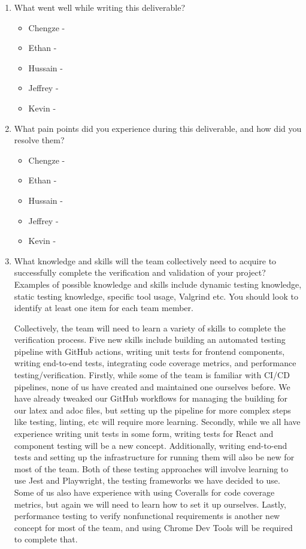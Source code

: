 \documentclass[12pt, titlepage]{article}
\begin{document}
\begin{enumerate}
  \item What went well while writing this deliverable?
  \begin{itemize}
    \item Chengze -
    \item Ethan -
    \item Hussain -
    \item Jeffrey -
    \item Kevin -
  \end{itemize}
  \item What pain points did you experience during this deliverable, and how
    did you resolve them?
  \begin{itemize}
    \item Chengze -
    \item Ethan -
    \item Hussain -
    \item Jeffrey -
    \item Kevin -
  \end{itemize}
  \item What knowledge and skills will the team collectively need to acquire to
  successfully complete the verification and validation of your project?
  Examples of possible knowledge and skills include dynamic testing knowledge,
  static testing knowledge, specific tool usage, Valgrind etc.  You should look to
  identify at least one item for each team member.

    Collectively, the team will need to learn a variety of skills to complete
    the verification process. Five new skills include building an automated
    testing pipeline with GitHub actions, writing unit tests for frontend
    components, writing end-to-end tests, integrating code coverage metrics,
    and performance testing/verification. Firstly, while some of the team is
    familiar with CI/CD pipelines, none of us have created and maintained one
    ourselves before. We have already tweaked our GitHub workflows for managing
    the building for our latex and adoc files, but setting up the pipeline for
    more complex steps like testing, linting, etc will require more learning.
    Secondly, while we all have experience writing unit tests in some form,
    writing tests for React and component testing will be a new concept.
    Additionally, writing end-to-end tests and setting up the infrastructure
    for running them will also be new for most of the team. Both of these
    testing approaches will involve learning to use Jest and Playwright, the
    testing frameworks we have decided to use. Some of us also have experience
    with using Coveralls for code coverage metrics, but again we will need to
    learn how to set it up ourselves. Lastly, performance testing to verify
    nonfunctional requirements is another new concept for most of the team, and
    using Chrome Dev Tools will be required to complete that.


\end{enumerate}
\end{document}
